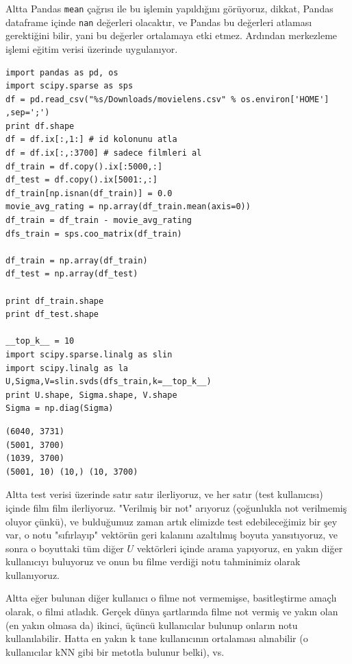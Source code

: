 \documentclass[12pt,fleqn]{article}\usepackage{../../common}
\begin{document}
Altta Pandas \verb!mean! çağrısı ile bu işlemin yapıldığını görüyoruz, dikkat,
Pandas dataframe içinde \verb!nan! değerleri olacaktır, ve Pandas bu değerleri
atlaması gerektiğini bilir, yani bu değerler ortalamaya etki etmez. Ardından
merkezleme işlemi eğitim verisi üzerinde uygulanıyor.

\begin{verbatim}
import pandas as pd, os
import scipy.sparse as sps
df = pd.read_csv("%s/Downloads/movielens.csv" % os.environ['HOME'] ,sep=';')
print df.shape
df = df.ix[:,1:] # id kolonunu atla
df = df.ix[:,:3700] # sadece filmleri al
df_train = df.copy().ix[:5000,:]
df_test = df.copy().ix[5001:,:]
df_train[np.isnan(df_train)] = 0.0
movie_avg_rating = np.array(df_train.mean(axis=0))
df_train = df_train - movie_avg_rating
dfs_train = sps.coo_matrix(df_train)

df_train = np.array(df_train)
df_test = np.array(df_test)

print df_train.shape
print df_test.shape

__top_k__ = 10
import scipy.sparse.linalg as slin
import scipy.linalg as la
U,Sigma,V=slin.svds(dfs_train,k=__top_k__)
print U.shape, Sigma.shape, V.shape
Sigma = np.diag(Sigma)
\end{verbatim}

\begin{verbatim}
(6040, 3731)
(5001, 3700)
(1039, 3700)
(5001, 10) (10,) (10, 3700)
\end{verbatim}

Altta test verisi üzerinde satır satır ilerliyoruz, ve her satır (test
kullanıcısı) içinde film film ilerliyoruz. "Verilmiş bir not" arıyoruz
(çoğunlukla not verilmemiş oluyor çünkü), ve bulduğumuz zaman artık
elimizde test edebileceğimiz bir şey var, o notu "sıfırlayıp" vektörün
geri kalanını azaltılmış boyuta yansıtıyoruz, ve sonra o boyuttaki tüm
diğer $U$ vektörleri içinde arama yapıyoruz, en yakın diğer
kullanıcıyı buluyoruz ve onun bu filme verdiği notu tahminimiz olarak
kullanıyoruz.

Altta eğer bulunan diğer kullanıcı o filme not vermemişse, basitleştirme
amaçlı olarak, o filmi atladık. Gerçek dünya şartlarında filme not vermiş
ve yakın olan (en yakın olmasa da) ikinci, üçüncü kullanıcılar bulunup
onların notu kullanılabilir. Hatta en yakın k tane kullanıcının ortalaması
alınabilir (o kullanıcılar kNN gibi bir metotla bulunur belki), vs.
\end{document}
